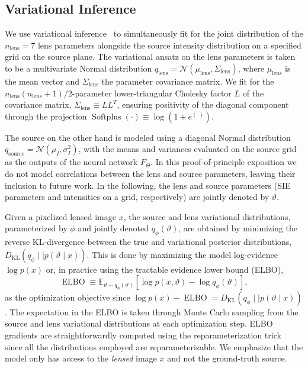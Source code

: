 \documentclass[nohyperref]{article}
\theoremstyle{plain}
\theoremstyle{definition}
\theoremstyle{remark}
\begin{document}
\subsection{Variational Inference}

We use variational inference~\cite{jordan1999introduction,blei2017variational} to simultaneously fit for the joint distribution of the $n_\mathrm{lens} = 7$ lens parameters alongside the source intensity distribution on a specified grid on the source plane. The variational ansatz on the lens parameters is taken to be a multivariate Normal distribution $q_\mathrm{lens} = \mathcal N(\mu_\mathrm{lens}, \Sigma_\mathrm{lens})$, where $\mu_\mathrm{lens}$ is the mean vector and $\Sigma_\mathrm{lens}$ the parameter covariance matrix. We fit for the $n_\mathrm{lens} (n_\mathrm{lens} + 1) / 2$-parameter lower-triangular Cholesky factor $L$ of the covariance matrix, $\Sigma_\mathrm{lens} \equiv LL^T$, ensuring positivity of the diagonal component through the projection $\operatorname{Softplus}(\cdot) \equiv \log\left(1 + e^{(\cdot)}\right)$.

The source on the other hand is modeled using a diagonal Normal distribution $q_\mathrm{source} = \mathcal N(\mu_I, \sigma_I^2)$, with the means and variances evaluated on the source grid as the outputs of the neural network $F_\Theta$. In this proof-of-principle exposition we do not model correlations between the lens and source parameters, leaving their inclusion to future work. In the following, the lens and source parameters (SIE parameters and intensities on a grid, respectively) are jointly denoted by $\vartheta$.

Given a pixelized lensed image $x$, the source and lens variational distributions, parameterized by $\phi$ and jointly denoted $q_\phi(\vartheta)$, are obtained by minimizing the reverse KL-divergence between the true and variational posterior distributions, $D_\mathrm{KL}\left(q_\phi\mid\mid p(\vartheta\mid x)\right)$. This is done by maximizing the model log-evidence $\log p(x)$ or, in practice using the tractable evidence lower bound (ELBO), 
\begin{equation}
\operatorname{ELBO} \equiv \mathbb E_{\vartheta\sim q_\phi(\vartheta)}\left[\log p(x, \vartheta) - \log q_\phi(\vartheta)\right],
\end{equation}
as the optimization objective since $\log p(x) - \operatorname{ELBO} = D_\mathrm{KL}\left(q_\phi\mid\mid p(\vartheta\mid x)\right)$. The expectation in the ELBO is taken through Monte Carlo sampling from the source and lens variational distributions at each optimization step. ELBO gradients are straightforwardly computed using the reparameterization trick~\cite{kingma2013auto} since all the distributions employed are reparameterizable. We emphasize that the model only has access to the \emph{lensed} image $x$ and not the ground-truth source.
\end{document}
